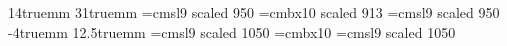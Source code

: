 \ifplaintex
\hoffset 14truemm
\voffset 31truemm
\font\phead=cmsl9 scaled 950
\font\pnum=cmbx10 scaled 913
\font\pfoot=cmsl9 scaled 950
\else
\headsep 23pt
\footskip 35pt
\hoffset -4truemm
\voffset 12.5truemm
\font\lhead=cmsl9 scaled 1050
\font\lnum=cmbx10 
\font\lfoot=cmsl9 scaled 1050
\makeatletter
\def\@oddhead{{\small\lhead\ifnum\count0=\startpage ISSN 1472-2739 
(on-line) 1472-2747 (printed)\hfill {\lnum\number\count0}\else\ifodd\count0
\def\\{ }\ifx\theshorttitle\relax \thetitle \else\theshorttitle\fi\hfill
{\lnum\number\count0}\else\def\\{ and }{\lnum\number\count0}
\hfill\ifx\theshortauthors\relax 
\theauthors\else\theshortauthors\fi\fi\fi}}\def\@evenhead{\@oddhead}
\def\@oddfoot{\small\lfoot\ifnum\count0=\startpage\copyright\ \gtp\hfill\else
\agt, Volume \thevolumenumber\ (\thevolumeyear)\hfill\fi}
\def\@evenfoot{\@oddfoot}
\makeatother
\fi
\let\maketitlepage\makeagttitle
\let\makeshorttitle\maketitlepage
\let\maketitle\maketitlepage

\endinput  %


